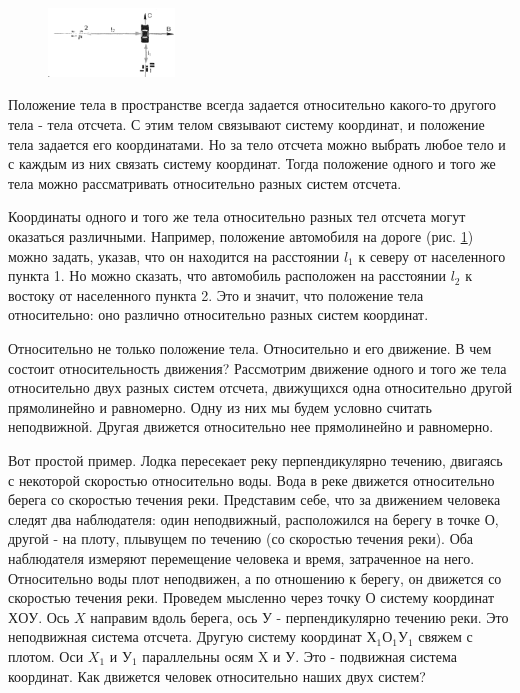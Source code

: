 \documentclass[a5paper, 10pt]{diss_4}
\renewcommand{\'}{\,'}
\begin{document}
\begin{figure}
\includegraphics[width=0.3\textwidth]{img/img_08.eps}
\caption{}
\label{fig8}
\end{figure}

 Положение тела в пространстве всегда задается относительно какого-то другого
тела - тела отсчета. С этим телом связывают систему координат, и положение тела
задается его координатами. Но за тело отсчета можно выбрать любое тело и с
каждым из них связать систему координат. Тогда положение одного и того же тела
можно рассматривать относительно разных систем отсчета.

  Координаты одного и того же тела относительно разных тел отсчета могут
оказаться различными. Например, положение автомобиля на дороге (рис. \ref{fig8}) можно
задать, указав, что он находится на расстоянии $l_1$ к северу от населенного
пункта 1. Но можно сказать, что автомобиль расположен на расстоянии $l_2$ к
востоку от населенного пункта 2. Это и значит, что положение тела относительно:
оно различно относительно разных систем координат.

  Относительно не только положение тела. Относительно и его движение. В чем
состоит относительность движения? Рассмотрим движение одного и того же тела
относительно двух разных систем отсчета, движущихся одна относительно другой
прямолинейно и равномерно. Одну из них мы будем условно считать неподвижной.
Другая движется относительно нее прямолинейно и равномерно.

  Вот простой пример. Лодка пересекает реку перпендикулярно течению, двигаясь с
 некоторой скоростью относительно воды. Вода в реке движется относительно
берега со скоростью течения реки. Представим себе, что за движением человека
следят два наблюдателя: один неподвижный, расположился на берегу в точке $О$,
другой - на плоту, плывущем по течению (со скоростью течения реки). Оба
наблюдателя измеряют перемещение человека и время, затраченное на него.
Относительно воды плот неподвижен, а по отношению к берегу, он движется со
скоростью течения реки. Проведем мысленно через точку $О$ систему координат
$ХОУ$. Ось $X$ направим вдоль берега, ось $У$ - перпендикулярно течению реки.
Это неподвижная система отсчета. Другую систему координат $Х_1 О_1 У_1$
свяжем с плотом. Оси $X_1$ и $У_1$ параллельны осям X и У. Это - подвижная
система координат. Как движется человек относительно наших двух систем?
\end{document}
